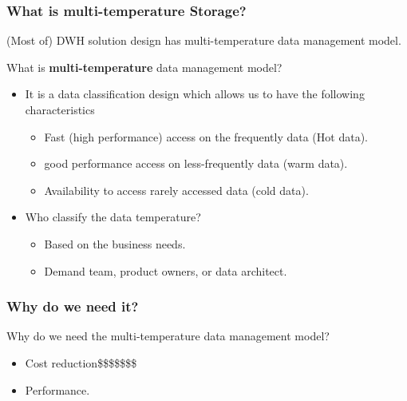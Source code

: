 \begin{frame}
\frametitle{What is multi-temperature Storage?}

\begin{wideitemize}
	\item (Most of) DWH solution design has multi-temperature data management model.
	\item What is \textbf{multi-temperature} data management model?
	\begin{itemize}[<+->]
		\item It is a data classification design which allows us to have the following characteristics 
			\begin{itemize}[<+->] 
				\item Fast (high performance) access on the frequently data (Hot data).%
				\item good performance access on less-frequently data (warm data).
				\item Availability to access rarely accessed data (cold data).
			\end{itemize}
 		\item Who classify the data temperature? 
 		\begin{itemize}[<+->] 
 			\item Based on the business needs.
 			\item Demand team, product owners, or data architect.
 		\end{itemize}
 		
	\end{itemize}

\end{wideitemize}
\end{frame}


\begin{frame}
\frametitle{Why do we need it?}

\begin{wideitemize}
	\item Why do we need the multi-temperature data management model?
	\begin{itemize}[<+->]
		\item Cost reduction\$\$\$\$\$\$\$ 
		\item Performance.
	\end{itemize}
\end{wideitemize}
\end{frame}


